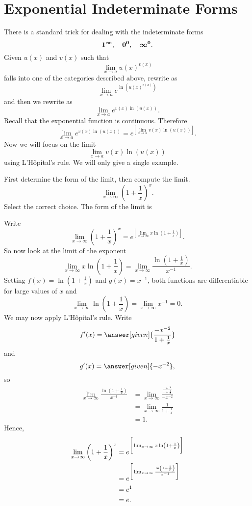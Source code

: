 \documentclass{ximera}
\begin{document}
\section{Exponential Indeterminate Forms}

There is a standard trick for dealing with the indeterminate forms
\[
\boldsymbol{1^\infty},\quad \boldsymbol{0^0},\quad \boldsymbol{\infty^0}.
\]
Given $u(x)$ and $v(x)$ such that
\[
\lim_{x\to a}u(x)^{v(x)}
\]
falls into one of the categories described above, rewrite as
\[
    \lim_{x\to a}e^{\ln\left(u(x)^{v(x)}\right)}
\]
and then we rewrite as
\[
    \lim_{x\to a}e^{v(x)\ln{(u(x))}}.
\]
 Recall that the exponential function is continuous. Therefore
\[
 \lim_{x\to a}e^{v(x)\ln{(u(x))}}=e^{\left[\lim_{x\to a} v(x)\ln(u(x))\right]}. 
\]
Now we will focus on the limit
\[
\lim_{x\to a} v(x)\ln(u(x))
\]
using L'H\^{o}pital's rule. We will only give a single example.

\begin{example}
First determine the form of the limit, then compute the limit.
\[
\lim_{x\to \infty}\left(1 + \frac{1}{x}\right)^x.
\]
  Select the correct choice. The form of the limit is
 \begin{multipleChoice}
     \choice{$\zeroOverZero$}
 \choice{ \inftyOverInfty}
 \choice{$\zeroTimesInfty$}
 \choice{ \inftyMinusInfty}
  \choice[correct] {$\oneToInfty$}
   \choice{$ \inftyToZero$}
   \choice{$\zeroToZero$}
  \end{multipleChoice}
\begin{explanation}
Write
\[
\lim_{x\to \infty}\left(1 + \frac{1}{x}\right)^x = e^{\left[\lim_{x\to \infty}x\ln\left(1 + \frac{1}{x}\right)\right]}.
\]
So now look at the limit of the exponent
\[
\lim_{x\to\infty} x\ln\left(1 + \frac{1}{x}\right) = \lim_{x\to\infty} \frac{\ln\left(1 + \frac{1}{x}\right)}{x^{-1}}.
\]
Setting $f(x) = \ln\left(1 + \frac{1}{x}\right)$ and $g(x) = x^{-1}$,
both functions are differentiable for large values of $x$ and
\[
\lim_{x\to \infty}\ln\left(1 + \frac{1}{x}\right)=\lim_{x\to \infty}x^{-1} = 0.
\]
We may now apply L'H\^{o}pital's rule. Write
\[
f'(x) = \answer[given]{\frac{-x^{-2}}{1 + \frac{1}{x}}}
\]
and
\[
g'(x) = \answer[given]{-x^{-2}},
\]
so
\begin{align*}
\lim_{x\to\infty} \frac{\ln\left(1 + \frac{1}{x}\right)}{x^{-1}} &= \lim_{x\to\infty} \frac{\frac{-x^{-2}}{1 + \frac{1}{x}}}{-x^{-2}} \\
&=\lim_{x\to\infty} \frac{1}{1 + \frac{1}{x}}\\
&=1.
\end{align*}
Hence, 
\begin{align*}
  \lim_{x\to \infty}\left(1 + \frac{1}{x}\right)^x &=e^{ \bigg[ \lim_{x\to \infty}x\ln\left(1 + \frac{1}{x}\right) \bigg]} \\
  &=e^{ \bigg[ \lim_{x\to\infty} \frac{\ln\left(1 + \frac{1}{x}\right)}{x^{-1}} \bigg]} \\
  &=e^{1} \\
  &= e.
\end{align*}
\end{explanation}
\end{example}
\end{document}
